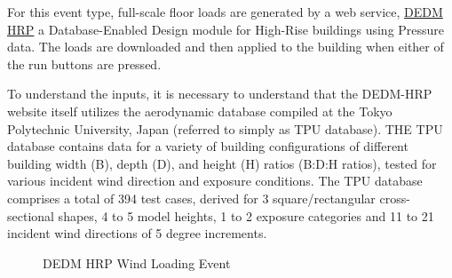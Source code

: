 For this event type, full-scale floor loads are generated by a web service, 
\href{http://evovw.ce.nd.edu/DEDM_HRP/DEDMP_INT_v3_4evo.html}{DEDM HRP} a Database-Enabled Design module 
for High-Rise buildings using Pressure data. The loads  are downloaded and then applied to the 
building when either of the run buttons are pressed.

To understand the inputs, it is necessary to understand that the DEDM-HRP website itself 
utilizes the aerodynamic database compiled at the Tokyo Polytechnic 
University, Japan (referred to simply as TPU database). THE TPU database contains data 
for a variety of building  configurations of different building width (B), depth (D), and 
height (H) ratios (B:D:H ratios), tested for various incident wind direction and exposure conditions.
 The TPU database comprises a total of 394 test cases, derived for 3 square/rectangular cross-sectional 
shapes, 4 to 5 model heights, 1 to 2 exposure categories and 11 to 21 incident wind directions of 5 
degree increments. 

\begin{figure}[!htbp]
  \caption{DEDM HRP Wind Loading Event}
  \label{fig:dedm_hrp}
\end{figure}

